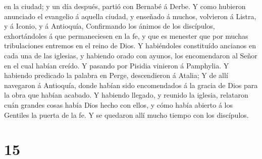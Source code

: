 en la ciudad; y un día después, partió con Bernabé á Derbe.
 Y como hubieron anunciado el evangelio á aquella ciudad, y
enseñado á muchos, volvieron á Listra, y á Iconio, y á Antioquía,
 Confirmando los ánimos de los discípulos, exhortándoles á
que permaneciesen en la fe, y que es menester que por muchas
tribulaciones entremos en el reino de Dios.  Y habiéndoles
constituído ancianos en cada una de las iglesias, y habiendo orado con
ayunos, los encomendaron al Señor en el cual habían creído.
 Y pasando por Pisidia vinieron á Pamphylia. 
Y habiendo predicado la palabra en Perge, descendieron á Atalia;
 Y de allí navegaron á Antioquía, donde habían sido
encomendados á la gracia de Dios para la obra que habían acabado.
 Y habiendo llegado, y reunido la iglesia, relataron cuán
grandes cosas había Dios hecho con ellos, y cómo había abierto á los
Gentiles la puerta de la fe.  Y se quedaron allí mucho
tiempo con los discípulos.

\hypertarget{section-14}{%
\section{15}\label{section-14}}

